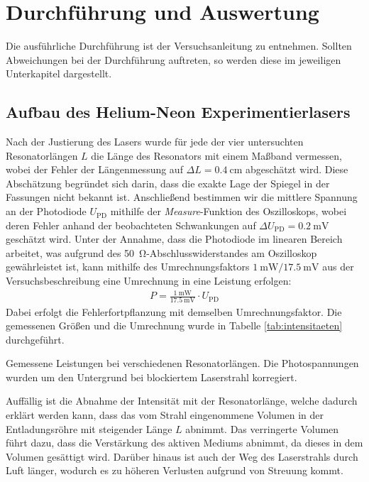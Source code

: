 \documentclass[11pt, a4paper]{article}
\numberwithin{equation}{section}
\begin{document}
\section{Durchführung und Auswertung}
Die ausführliche Durchführung ist der Versuchsanleitung \cite{anleitung} zu entnehmen.
Sollten Abweichungen bei der Durchführung auftreten, so werden diese im jeweiligen Unterkapitel dargestellt.

\subsection{Aufbau des Helium-Neon Experimentierlasers}
Nach der Justierung des Lasers wurde für jede der vier untersuchten Resonatorlängen $L$ die Länge des Resonators mit einem Maßband vermessen, wobei der Fehler der Längenmessung auf $\Delta L = \SI{0.4}{\centi\metre}$ abgeschätzt wird.
Diese Abschätzung begründet sich darin, dass die exakte Lage der Spiegel in der Fassungen nicht bekannt ist.
Anschließend bestimmen wir die mittlere Spannung an der Photodiode $U_\mathrm{PD}$ mithilfe der \textit{Measure}-Funktion des Oszilloskops, wobei deren Fehler anhand der beobachteten Schwankungen auf $\Delta U_\mathrm{PD} = \SI{0.2}{\milli\volt}$ geschätzt wird.
Unter der Annahme, dass die Photodiode im linearen Bereich arbeitet, was aufgrund des \SI{50}{\ohm}-Abschlusswiderstandes am Oszilloskop gewährleistet ist, kann mithilfe des Umrechnungsfaktors $\SI{1}{\milli\watt} / \SI{17.5}{\milli\volt}$ aus der Versuchsbeschreibung \cite{anleitung} eine Umrechnung in eine Leistung erfolgen:
\begin{align}
	P = \frac{\SI{1}{\milli\watt}}{\SI{17.5}{\milli\volt}} \cdot U_\mathrm{PD}
	\label{eq:umrechnung_watt}
\end{align}
Dabei erfolgt die Fehlerfortpflanzung mit demselben Umrechnungsfaktor.
Die gemessenen Größen und die Umrechnung wurde in Tabelle \ref{tab:intensitaeten} durchgeführt.
\begin{table}[h]
	\centering
	
	\caption{Gemessene Leistungen bei verschiedenen Resonatorlängen. Die Photospannungen wurden um den Untergrund bei blockiertem Laserstrahl korregiert.}
	\label{tab:intensitaeten}
\end{table}
Auffällig ist die Abnahme der Intensität mit der Resonatorlänge, welche dadurch erklärt werden kann, dass das vom Strahl eingenommene Volumen in der Entladungsröhre mit steigender Länge $L$ abnimmt.
Das verringerte Volumen führt dazu, dass die Verstärkung des aktiven Mediums abnimmt, da dieses in dem Volumen gesättigt wird.
Darüber hinaus ist auch der Weg des Laserstrahls durch Luft länger, wodurch es zu höheren Verlusten aufgrund von Streuung kommt.
\end{document}
